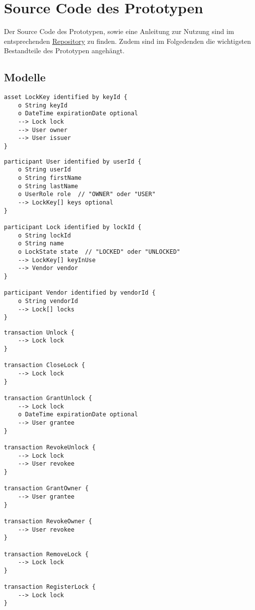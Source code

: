 \section{Source Code des Prototypen}
\label{apx:prototype}
    Der Source Code des Prototypen, sowie eine Anleitung zur Nutzung sind im entsprechenden  \href{https://github.com/qn0x/smart-lock-prototype}{Repository} zu finden.
    Zudem sind im Folgedenden die wichtigsten Bestandteile des Prototypen angehängt.
    \vspace{-1em}
    \subsection{Modelle}
        \begin{lstlisting}[caption={Assets},label=model_assets,captionpos=b]
asset LockKey identified by keyId {
    o String keyId
    o DateTime expirationDate optional
    --> Lock lock
    --> User owner
    --> User issuer
}
        \end{lstlisting}
        
        \begin{lstlisting}[caption={Participant-Typen},label=model_participants,captionpos=b]
participant User identified by userId {
    o String userId
    o String firstName
    o String lastName
    o UserRole role  // "OWNER" oder "USER"
    --> LockKey[] keys optional
}

participant Lock identified by lockId {
    o String lockId
    o String name
    o LockState state  // "LOCKED" oder "UNLOCKED"
    --> LockKey[] keyInUse
    --> Vendor vendor
}

participant Vendor identified by vendorId {
    o String vendorId
    --> Lock[] locks
}
        \end{lstlisting}
        \vspace{1em}
        \begin{lstlisting}[caption={Auswahl relevanter Transactions},label=model_transactopms,captionpos=b]
transaction Unlock {
    --> Lock lock
}

transaction CloseLock {
    --> Lock lock
}

transaction GrantUnlock {
    --> Lock lock
    o DateTime expirationDate optional
    --> User grantee
}

transaction RevokeUnlock {
    --> Lock lock
    --> User revokee
}

transaction GrantOwner {
    --> User grantee
}

transaction RevokeOwner {
    --> User revokee
}

transaction RemoveLock {
    --> Lock lock
}

transaction RegisterLock {
    --> Lock lock
}
        \end{lstlisting}
    \newpage
